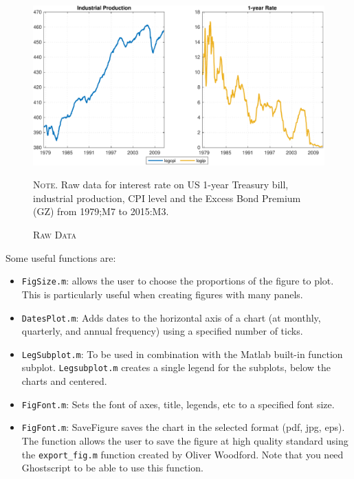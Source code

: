 \documentclass[10pt]{article}
\begin{document}
\begin{figure}[th]
\centering%
\begin{minipage}[b]{.9\textwidth}
\caption{\scshape{Raw Data}}\vspace{0.1cm}
\begin{center}
\includegraphics[width=\textwidth]{F1_PLOT}
\end{center}%
\footnotesize{{\scshape Note.} Raw data for interest rate on US 1-year Treasury bill, industrial production, CPI level and the Excess Bond Premium (GZ) from 1979;M7 to 2015:M3.}
\label{fig:F1_PLOT}
\end{minipage}
\end{figure}

Some useful functions are:

\begin{itemize}
\item \texttt{FigSize.m}: allows the user to choose the proportions of the
figure to plot. This is particularly useful when creating figures with many
panels.

\item \texttt{DatesPlot.m}: Adds dates to the horizontal axis of a chart (at
monthly, quarterly, and annual frequency) using a specified number of ticks.

\item \texttt{LegSubplot.m}: To be used in combination with the Matlab
built-in function subplot. \texttt{Legsubplot.m} creates a single legend for
the subplots, below the charts and centered.

\item \texttt{FigFont.m}: Sets the font of axes, title, legends, etc to a
specified font size.

\item \texttt{FigFont.m}: SaveFigure saves the chart in the selected format
(pdf, jpg, eps). The function allows the user to save the figure at high
quality standard using the \texttt{export\_fig.m} function created by Oliver
Woodford. Note that you need Ghostscript to be able to use this function.
\end{itemize}
\end{document}
